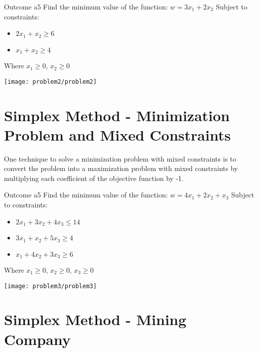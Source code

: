 \begin{problem}{Outcome a}{5}
    Find the minimum value of the function: $w = 3x_1 + 2x_2$ \newline\newline
    Subject to constraints:
    \begin{itemize}
        \item $2x_1 + x_2 \geq 6$
        \item $x_1 + x_2 \geq 4$
    \end{itemize}
    Where $x_1 \geq 0$, $x_2 \geq 0$


    \begin{center}
        \texttt{[image: problem2/problem2]}%
    \end{center}

\end{problem}


\section{Simplex Method - Minimization Problem and Mixed Constraints}

One technique to solve a minimization problem with mixed constraints is to convert the problem into a maximization problem with mixed constraints by multiplying each coefficient of the objective function by -1.

\begin{problem}{Outcome a}{5}
    Find the minimum value of the function: $w = 4x_1 + 2x_2 + x_3$ \newline\newline
    Subject to constraints:
    \begin{itemize}
        \item $2x_1 + 3x_2 + 4x_3 \leq 14$
        \item $3x_1 + x_2  + 5x_3\geq 4$
        \item $x_1 + 4x_2  + 3x_3\geq 6$
    \end{itemize}
    Where $x_1 \geq 0$, $x_2 \geq 0$, $x_3 \geq 0$

    \begin{center}
        \texttt{[image: problem3/problem3]}%
    \end{center}

\end{problem}

\section{Simplex Method - Mining Company}

